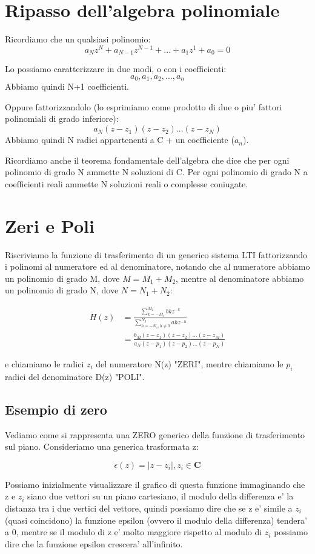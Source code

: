 \section{Ripasso dell'algebra polinomiale}
Ricordiamo che un qualsiasi polinomio:
\[
    a_N z^N + a_{N-1}z^{N-1} +...+ a_1 z^1 + a_0 = 0
\]

Lo possiamo caratterizzare in due modi, o con i coefficienti:
\[
    a_0, a_1, a_2, ..., a_n
\]
Abbiamo quindi N+1 coefficienti.

Oppure fattorizzandolo (lo esprimiamo come prodotto di due o piu' fattori polinomiali di grado inferiore):
\[
    a_N(z - z_1)(z - z_2)...(z-z_N)
\]
Abbiamo quindi N radici appartenenti a C + un coefficiente ($a_n$).

Ricordiamo anche il teorema fondamentale dell'algebra che dice che per ogni polinomio di grado N ammette N soluzioni di C. Per ogni polinomio di grado N a coefficienti reali ammette N soluzioni reali o complesse coniugate.

\section{Zeri e Poli}
Riscriviamo la funzione di trasferimento di un generico sistema LTI fattorizzando i polinomi al numeratore ed al denominatore, notando che al numeratore abbiamo un polinomio di grado M, dove $M = M_1 + M_2$, mentre al denominatore abbiamo un polinomio di grado N, dove $N = N_1 + N_2$:

\[\begin{split}
    H(z) &= \frac{\sum_{k = -M_1}^{M_2} bk  z^{-k}}{\sum_{h = -N_1, h \neq 0}^{N_2} ah z^{-h}} \\
    &= \frac{b_M(z - z_1)(z-z_2) ... (z - z_M)}{a_N(z - p_1)(z-p_2) ... (z - p_N)}
\end{split}\]

e chiamiamo le radici $z_i$ del numeratore N(z) "ZERI", mentre chiamiamo le $p_i$ radici del denominatore D(z) "POLI".

\subsection{Esempio di zero}
Vediamo come si rappresenta una ZERO generico della funzione di trasferimento sul piano.
Consideriamo una generica trasformata z:

\[
    \epsilon(z) = |z - z_i|, z_i \in \mathbf{C}
\]

Possiamo inizialmente visualizzare il grafico di questa funzione immaginando che z e $z_i$ siano due vettori su un piano cartesiano, il modulo della differenza e' la distanza tra i due vertici del vettore, quindi possiamo dire che se z e' simile a $z_i$ (quasi coincidono) la funzione epsilon (ovvero il modulo della differenza) tendera' a 0, mentre se il modulo di z e' molto maggiore rispetto al modulo di $z_i$ possiamo dire che la funzione epsilon crescera' all'infinito.

